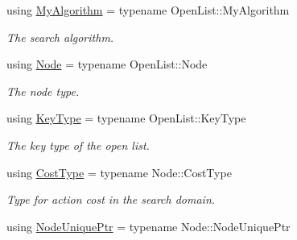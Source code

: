 \begin{DoxyCompactItemize}
\item 
using \hyperlink{structOpenClosedList_ad62a058ca7c52556d95529467a8eb9c9}{My\+Algorithm} = typename Open\+List\+::\+My\+Algorithm\hypertarget{structOpenClosedList_ad62a058ca7c52556d95529467a8eb9c9}{}\label{structOpenClosedList_ad62a058ca7c52556d95529467a8eb9c9}

\begin{DoxyCompactList}\small\item\em The search algorithm. \end{DoxyCompactList}\item 
using \hyperlink{structOpenClosedList_ad537fb81d3482e41e8ad0ee9288819c9}{Node} = typename Open\+List\+::\+Node\hypertarget{structOpenClosedList_ad537fb81d3482e41e8ad0ee9288819c9}{}\label{structOpenClosedList_ad537fb81d3482e41e8ad0ee9288819c9}

\begin{DoxyCompactList}\small\item\em The node type. \end{DoxyCompactList}\item 
using \hyperlink{structOpenClosedList_a396ae2c0d03cce359af0d6fd314f663c}{Key\+Type} = typename Open\+List\+::\+Key\+Type\hypertarget{structOpenClosedList_a396ae2c0d03cce359af0d6fd314f663c}{}\label{structOpenClosedList_a396ae2c0d03cce359af0d6fd314f663c}

\begin{DoxyCompactList}\small\item\em The key type of the open list. \end{DoxyCompactList}\item 
using \hyperlink{structOpenClosedList_a7cd4fee19ec797a970f4f801d6f626bb}{Cost\+Type} = typename Node\+::\+Cost\+Type\hypertarget{structOpenClosedList_a7cd4fee19ec797a970f4f801d6f626bb}{}\label{structOpenClosedList_a7cd4fee19ec797a970f4f801d6f626bb}

\begin{DoxyCompactList}\small\item\em Type for action cost in the search domain. \end{DoxyCompactList}\item 
using \hyperlink{structOpenClosedList_a9dbc60979a564fc7d5d0ff563f5406a1}{Node\+Unique\+Ptr} = typename Node\+::\+Node\+Unique\+Ptr\hypertarget{structOpenClosedList_a9dbc60979a564fc7d5d0ff563f5406a1}{}\label{structOpenClosedList_a9dbc60979a564fc7d5d0ff563f5406a1}


\end{DoxyCompactItemize}
